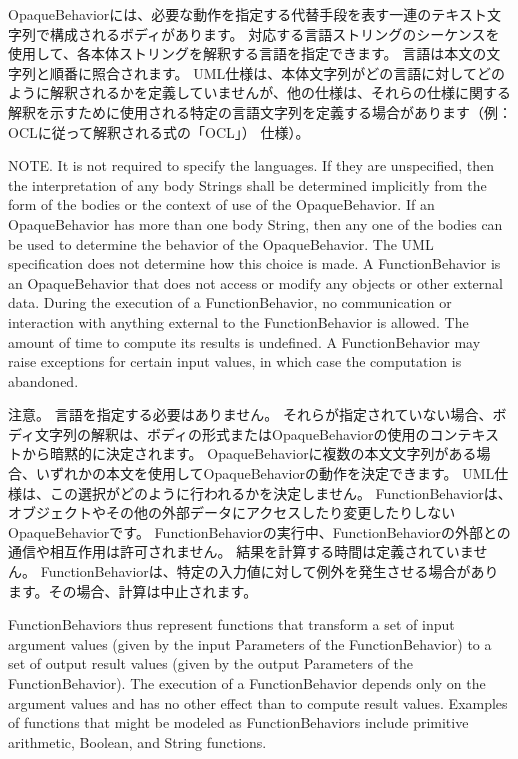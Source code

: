 \documentclass[a4paper,11pt]{ltjsarticle}
\begin{document}
OpaqueBehaviorには、必要な動作を指定する代替手段を表す一連のテキスト文字列で構成されるボディがあります。
対応する言語ストリングのシーケンスを使用して、各本体ストリングを解釈する言語を指定できます。
言語は本文の文字列と順番に照合されます。
UML仕様は、本体文字列がどの言語に対してどのように解釈されるかを定義していませんが、他の仕様は、それらの仕様に関する解釈を示すために使用される特定の言語文字列を定義する場合があります（例：OCLに従って解釈される式の「OCL」） 仕様）。

NOTE. It is not required to specify the languages. 
If they are unspecified, then the interpretation of any body Strings shall be determined implicitly from the form of the bodies or the context of use of the OpaqueBehavior.
If an OpaqueBehavior has more than one body String, then any one of the bodies can be used to determine the behavior of the OpaqueBehavior. 
The UML specification does not determine how this choice is made. 
A FunctionBehavior is an OpaqueBehavior that does not access or modify any objects or other external data. 
During the execution of a FunctionBehavior, no communication or interaction with anything external to the FunctionBehavior is allowed. 
The amount of time to compute its results is undefined. 
A FunctionBehavior may raise exceptions for certain input values, in which case the computation is abandoned.

注意。 言語を指定する必要はありません。
それらが指定されていない場合、ボディ文字列の解釈は、ボディの形式またはOpaqueBehaviorの使用のコンテキストから暗黙的に決定されます。
OpaqueBehaviorに複数の本文文字列がある場合、いずれかの本文を使用してOpaqueBehaviorの動作を決定できます。
UML仕様は、この選択がどのように行われるかを決定しません。
FunctionBehaviorは、オブジェクトやその他の外部データにアクセスしたり変更したりしないOpaqueBehaviorです。
FunctionBehaviorの実行中、FunctionBehaviorの外部との通信や相互作用は許可されません。
結果を計算する時間は定義されていません。
FunctionBehaviorは、特定の入力値に対して例外を発生させる場合があります。その場合、計算は中止されます。

FunctionBehaviors thus represent functions that transform a set of input argument values (given by the input Parameters of the FunctionBehavior) to a set of output result values (given by the output Parameters of the FunctionBehavior). 
The execution of a FunctionBehavior depends only on the argument values and has no other effect than to compute result values. 
Examples of functions that might be modeled as FunctionBehaviors include primitive arithmetic, Boolean, and String functions.
\end{document}
